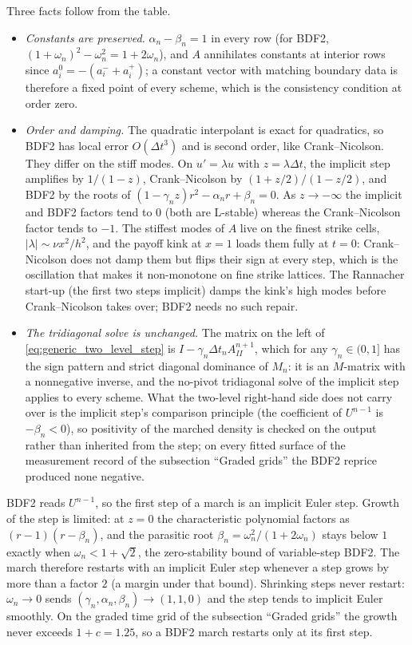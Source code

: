 \documentclass[11pt]{article}
\newcommand{\1}{\mathbf{1}}
\newcommand{\vloc}{\nu}
\begin{document}
Three facts follow from the table.
\begin{itemize}[leftmargin=1.1cm]
\item \emph{Constants are preserved.} $\alpha_n-\beta_n=1$ in every row (for BDF2,
      $(1+\omega_n)^2-\omega_n^2=1+2\omega_n$), and $A$ annihilates constants at interior
      rows since $a_i^0=-(a_i^-+a_i^+)$; a constant vector with matching boundary data is
      therefore a fixed point of every scheme, which is the consistency condition at
      order zero.
\item \emph{Order and damping.} The quadratic interpolant is exact for quadratics, so
      BDF2 has local error $O(\Delta t^3)$ and is second order, like Crank--Nicolson.
      They differ on the stiff modes. On $u'=\lambda u$ with $z=\lambda\Delta t$, the
      implicit step amplifies by $1/(1-z)$, Crank--Nicolson by $(1+z/2)/(1-z/2)$, and
      BDF2 by the roots of $(1-\gamma_nz)r^2-\alpha_nr+\beta_n=0$. As $z\to-\infty$ the
      implicit and BDF2 factors tend to $0$ (both are L-stable) whereas the
      Crank--Nicolson factor tends to $-1$. The stiffest modes of $A$ live on the finest
      strike cells, $|\lambda|\sim\vloc x^2/h^2$, and the payoff kink at $x=1$ loads them
      fully at $t=0$: Crank--Nicolson does not damp them but flips their sign at every
      step, which is the oscillation that makes it non-monotone on fine strike lattices.
      The Rannacher start-up (the first two steps implicit) damps the kink's high modes
      before Crank--Nicolson takes over; BDF2 needs no such repair.
\item \emph{The tridiagonal solve is unchanged.} The matrix on the left of
      \eqref{eq:generic_two_level_step} is $I-\gamma_n\Delta t_nA^{n+1}_{II}$, which for
      any $\gamma_n\in(0,1]$ has the sign pattern and strict diagonal dominance of $M_n$:
      it is an $M$-matrix with a nonnegative inverse, and the no-pivot tridiagonal solve
      of the implicit step applies to every scheme. What the two-level right-hand side
      does not carry over is the implicit step's comparison principle (the coefficient of
      $U^{n-1}$ is $-\beta_n<0$), so positivity of the marched density is checked on the
      output rather than inherited from the step; on every fitted surface of the
      measurement record of the subsection ``Graded grids'' the BDF2 reprice produced
      none negative.
\end{itemize}

BDF2 reads $U^{n-1}$, so the first step of a march is an implicit Euler step. Growth of
the step is limited: at $z=0$ the characteristic polynomial factors as
$(r-1)(r-\beta_n)$, and the parasitic root $\beta_n=\omega_n^2/(1+2\omega_n)$ stays below
$1$ exactly when $\omega_n<1+\sqrt2$, the zero-stability bound of variable-step BDF2.
The march therefore restarts with an implicit Euler step whenever a step grows by more
than a factor $2$ (a margin under that bound). Shrinking steps never restart:
$\omega_n\to0$ sends $(\gamma_n,\alpha_n,\beta_n)\to(1,1,0)$ and the step tends to
implicit Euler smoothly. On the graded time grid of the subsection ``Graded grids'' the
growth never exceeds $1+c=1.25$, so a BDF2 march restarts only at its first step.
\end{document}
